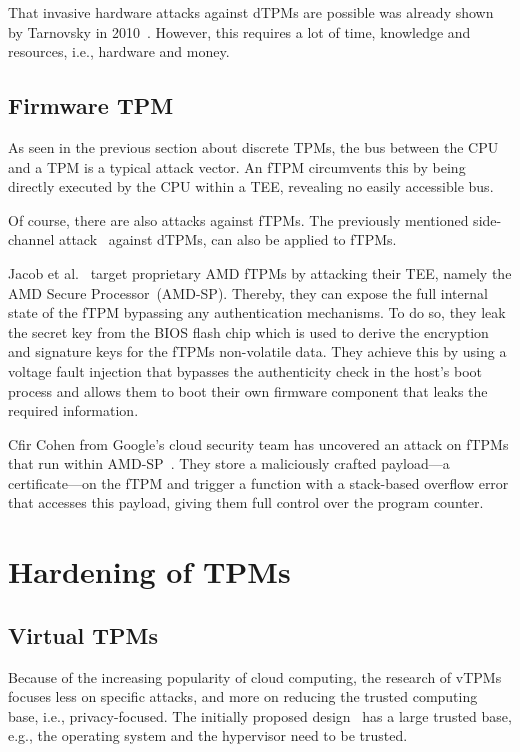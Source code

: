 That invasive hardware attacks against dTPMs are possible was already shown by Tarnovsky in 2010~\cite{tarnovsky}.
However, this requires a lot of time, knowledge and resources, i.e., hardware and money.

\subsection{Firmware TPM}

As seen in the previous section about discrete TPMs, the bus between the CPU and a TPM is a typical attack vector.
An fTPM circumvents this by being directly executed by the CPU within a \ac{TEE}, revealing no easily accessible bus.

Of course, there are also attacks against fTPMs.
The previously mentioned side-channel attack~\cite{Moghimi2019} against dTPMs, can also be applied to fTPMs.

Jacob et al.~\cite{Jacob2023} target proprietary AMD fTPMs by attacking their \ac{TEE}, namely the AMD Secure Processor~(AMD-SP).
Thereby, they can expose the full internal state of the fTPM bypassing any authentication mechanisms.
To do so, they leak the secret key from the BIOS flash chip which is used to derive the encryption and signature keys for the fTPMs non-volatile data.
They achieve this by using a voltage fault injection that bypasses the authenticity check in the host's boot process and allows them to boot their own firmware component that leaks the required information.

Cfir Cohen from Google's cloud security team has uncovered an attack on fTPMs that run within AMD-SP~\cite{cohen}.
They store a maliciously crafted payload---a certificate---on the fTPM and trigger a function with a stack-based overflow error that accesses this payload, giving them full control over the program counter.

\section{Hardening of TPMs}

\subsection{Virtual TPMs}

Because of the increasing popularity of cloud computing, the research of vTPMs focuses less on specific attacks, and more on reducing the trusted computing base, i.e., privacy-focused.
The initially proposed design~\cite{268868} has a large trusted base, e.g., the operating system and the hypervisor need to be trusted.

